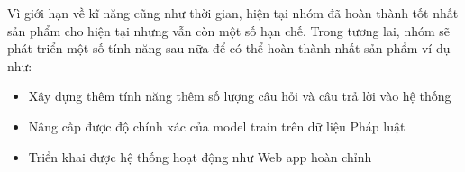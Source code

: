Vì giới hạn về kĩ năng cũng như thời gian, hiện tại nhóm đã hoàn thành tốt nhất sản phẩm cho hiện tại nhưng vẫn còn một số hạn chế. Trong tương lai, nhóm sẽ phát triển một số tính năng sau nữa để có thể hoàn thành nhất sản phẩm ví dụ như:
\begin{itemize}
	\item [-] Xây dựng thêm tính năng thêm số lượng câu hỏi và câu trả lời vào hệ thống
	\item [-] Nâng cấp được độ chính xác của model train trên dữ liệu Pháp luật
	\item [-] Triển khai được hệ thống hoạt động như Web app hoàn chỉnh
\end{itemize}

